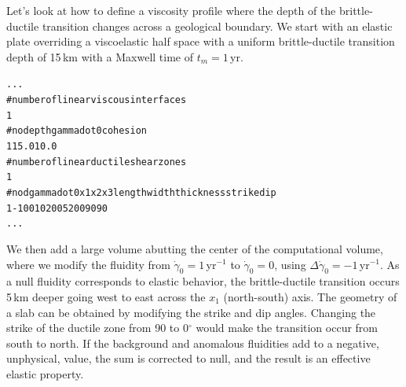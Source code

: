 \documentclass[10pt]{article}
\begin{document}
Let's look at how to define a viscosity profile where the depth of the brittle-ductile transition changes across a geological boundary. We start with an elastic plate overriding a viscoelastic half space with a uniform brittle-ductile transition depth of 15\,km with a Maxwell time of $t_m=1\,$yr.
\begin{alltt}
...
# number of linear viscous interfaces
{\color{orange}1}
# no depth gammadot0 cohesion
{\color{orange}   1  15.0         1      0.0}
# number of linear ductile shear zones
{\color{orange}1}
# no dgammadot0 x1  x2 x3 length width thickness strike dip
{\color{orange}   1         -1  0   0 10    200     5       200     90  90}
...
\end{alltt}
We then add a large volume abutting the center of the computational volume, where we modify the fluidity from $\dot{\gamma}_0=1\,$yr$^{-1}$ to $\dot{\gamma}_0=0$, using $\Delta\dot{\gamma}_0=-1\,$yr$^{-1}$. As a null fluidity corresponds to elastic behavior, the brittle-ductile transition occurs 5\,km deeper going west to east across the $x_1$ (north-south) axis. The geometry of a slab can be obtained by modifying the strike and dip angles. Changing the strike of the ductile zone from 90 to 0$^\circ$ would make the transition occur from south to north. If the background and anomalous fluidities add to a negative, unphysical, value, the sum is corrected to null, and the result is an effective elastic property. 
\end{document}
